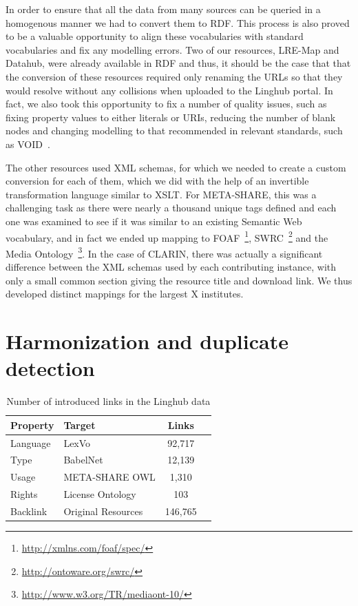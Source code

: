 \documentclass[11pt]{article}
\begin{document}
In order to ensure that all the data from many sources can be queried in a
homogenous manner we had to convert them to RDF. This process is also proved to
be a valuable opportunity to align these vocabularies with standard vocabularies
and fix any modelling errors. Two of our resources, LRE-Map and Datahub, were already available in RDF
and thus, it should be the case that that the conversion of these resources
required only renaming the URLs so that they would resolve without any
collisions when uploaded to the Linghub portal. In fact, we also took this
opportunity to fix a number of quality issues, such as fixing property values to
either literals or URIs, reducing the number of blank nodes and changing
modelling to that recommended in relevant standards, such as
VOID~\cite{alexander2011describing}. 

The other resources used XML schemas, for which we needed to create a custom
conversion for each of them, which we did with the help of an invertible
transformation language similar to XSLT. For META-SHARE, this was a challenging
task as there were nearly a thousand unique tags defined and each one was
examined to see if it was similar to an existing Semantic Web vocabulary, and in
fact we ended up mapping to FOAF~\footnote{\url{http://xmlns.com/foaf/spec/}},
SWRC~\footnote{\url{http://ontoware.org/swrc/}} and the Media
Ontology~\footnote{\url{http://www.w3.org/TR/mediaont-10/}}. In the case of
CLARIN, there was actually a significant difference between the XML schemas used
by each contributing instance, with only a small common section giving the
resource title and download link. We thus developed distinct mappings for the
largest X institutes.

\section{Harmonization and duplicate detection}

\begin{table}
	\centering	
	\begin{tabular}{p{50mm}p{50mm}|cc}
	Property     & Target             & Links        \\
	\hline
	Language     & LexVo              & 92,717       \\
	Type         & BabelNet           & 12,139       \\
	Usage        & META-SHARE OWL     & 1,310        \\
	Rights       & License Ontology   & 103          \\
	Backlink     & Original Resources & 146,765      \\
	\end{tabular}
	\caption{Number of introduced links in the Linghub data\label{tab:links}}
\end{table}	
\end{document}
